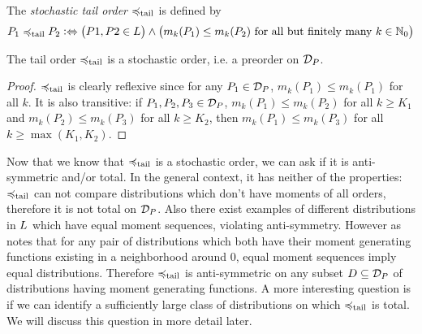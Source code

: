 \documentclass[a4paper]{scrreprt}
\begin{document}
    \begin{defn}[Stochastic Tail Order]
        The \emph{stochastic tail order} $\preccurlyeq_{\text{tail}}$ is defined by
        \begin{gather*}
            P_1 \preccurlyeq_{\text{tail}} P_2 \mathrel{\vcentcolon\Leftrightarrow} \bigl(P1, P2 \in L\bigr) \wedge \bigl(m_k(P_1) \leq m_k(P_2) \text{ for all but finitely many $k \in \mathbb{N}_0$}\bigr)
        \end{gather*}
    \end{defn}

    \begin{lemma}
        The tail order $\preccurlyeq_{\text{tail}}$ is a stochastic order, i.e. a preorder on $\mathcal{D}_P$.
    \end{lemma}
    \begin{proof}
        $\preccurlyeq_{\text{tail}}$ is clearly reflexive since for any $P_1 \in \mathcal{D}_P$, $m_k(P_1) \leq m_k(P_1)$ for all $k$.
        It is also transitive: if $P_1, P_2, P_3 \in \mathcal{D}_P$, $m_k(P_1) \leq m_k(P_2)$ for all $k \geq K_1$ and $m_k(P_2) \leq m_k(P_3)$ for all $k \geq K_2$, then $m_k(P_1) \leq m_k(P_3)$ for all $k \geq \max(K_1, K_2)$.
    \end{proof}
    
    Now that we know that $\preccurlyeq_{\text{tail}}$ is a stochastic order, we can ask if it is anti-symmetric and/or total.
    In the general context, it has neither of the properties: $\preccurlyeq_{\text{tail}}$ can not compare distributions which don't have moments of all orders, therefore it is not total on $\mathcal{D}_P$.
    Also there exist examples of different distributions in $L$ which have equal moment sequences, violating anti-symmetry. However as \cite{bib:rassGameRiskManagI} notes that for any pair of distributions which both have their moment generating functions existing in a neighborhood around 0, equal moment sequences imply equal distributions.
    Therefore $\preccurlyeq_{\text{tail}}$ is anti-symmetric on any subset $D \subseteq \mathcal{D}_P$ of distributions having moment generating functions.
    A more interesting question is if we can identify a sufficiently large class of distributions on which $\preccurlyeq_{\text{tail}}$ is total. We will discuss this question in more detail later.
    
\end{document}
